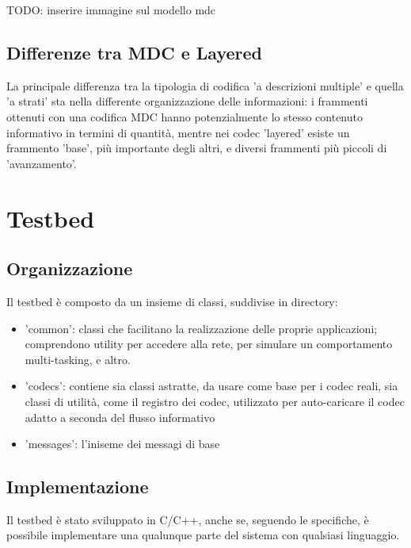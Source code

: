 TODO: inserire immagine sul modello mdc

\subsection{Differenze tra MDC e Layered}

La principale differenza tra la tipologia di codifica 'a descrizioni multiple' e
quella 'a strati' sta nella differente organizzazione delle informazioni: i
frammenti ottenuti con una codifica MDC hanno potenzialmente lo stesso contenuto
informativo in termini di quantità, mentre nei codec 'layered' esiste un
frammento 'base', più importante degli altri, e diversi frammenti più piccoli di
'avanzamento'.






\section{Testbed}



\subsection{Organizzazione}


Il testbed è composto da un insieme di classi, suddivise in directory:



\begin{itemize}
\item 'common': classi che facilitano la realizzazione delle proprie applicazioni; comprendono utility per accedere alla rete, per simulare un comportamento multi-tasking, e altro.

\item 'codecs': contiene sia classi astratte, da usare come base per i codec
reali, sia classi di utilità, come il registro dei codec, utilizzato per auto-caricare il codec adatto a seconda del flusso informativo

\item 'messages': l'iniseme dei messagi di base
\end{itemize}




\subsection{Implementazione}


Il testbed è stato sviluppato in C/C++, anche se, seguendo le specifiche, è
possibile implementare una qualunque parte del sistema con qualsiasi linguaggio.



